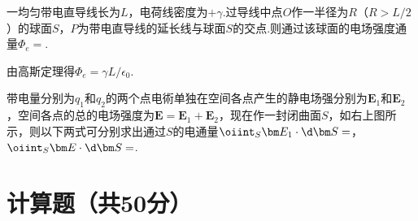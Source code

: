\begin{problem} %
    一均匀带电直导线长为$L$，电荷线密度为$+\gamma$.过导线中点$O$作一半径为$R$（$R>L/2$）的球面$S$，$P$为带电直导线的延长线与球面$S$的交点.则通过该球面的电场强度通量$\Phi_e=$.
\end{problem}
\begin{solution}
    由高斯定理得$\Phi_e=\gamma L/\epsilon_0$.
\end{solution}

\begin{problem}
    带电量分别为$q_1$和$q_2$的两个点电術单独在空间各点产生的静电场强分别为$\bm E_1$和$\bm E_2$，空间各点的总的电场强度为$\bm E=\bm E_1+\bm E_2$，现在作一封闭曲面$S$，如右上图所示，则以下两式可分别求出通过$S$的电通量$\oiint_S\bm E_1\cdot\d\bm S=$，$\oiint_S\bm E\cdot\d\bm S=$.
\end{problem}

\section{计算题（共50分）}

